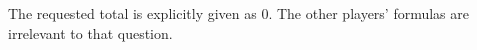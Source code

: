 The requested total is explicitly given as $\boxed0$. The other players' formulas are irrelevant to that question.
